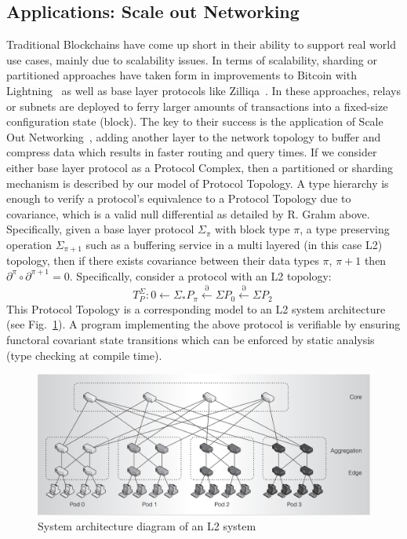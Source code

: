 \documentclass[runningheads]{llncs}
\begin{document}
\subsection{Applications: Scale out Networking}
Traditional Blockchains have come up short in their ability to support real world use cases, mainly due to scalability issues. In terms of scalability, sharding or partitioned approaches have taken form in improvements to Bitcoin with Lightning~\cite{ref_url4} as well as base layer protocols like Zilliqa~\cite{ref_url5}. In these approaches, relays or subnets are deployed to ferry larger amounts of transactions into a fixed-size configuration state (block). The key to their success is the application of Scale Out Networking~\cite{ref_article11}, adding another layer to the network topology to buffer and compress data which results in faster routing and query times. If we consider either base layer protocol as a Protocol Complex, then a partitioned or sharding mechanism is described by our model of Protocol Topology. A type hierarchy is enough to verify a protocol's equivalence to a Protocol Topology due to covariance, which is a valid null differential as detailed by R. Grahm above. Specifically, given a base layer protocol $\Sigma_\pi$ with block type $\pi$, a type preserving operation $\Sigma_{\pi+1}$ such as a buffering service in a multi layered (in this case L2) topology, then if there exists covariance between their data types $\pi$, $\pi+1$ then $\partial^\pi \circ \partial^{\pi+1} = 0$. Specifically, consider a protocol with an L2 topology:
\begin{equation}
T^{\Sigma}_P: 0 \leftarrow \Sigma_{*}P_\pi \xleftarrow{\partial} \Sigma P_{0} \xleftarrow{\partial} \Sigma P_2 \ 
\end{equation}
This Protocol Topology is a corresponding model to an L2 system architecture (see Fig.~\ref{fig1}). A program implementing the above protocol is verifiable by ensuring functoral covariant state transitions which can be enforced by static analysis~\cite{ref_article10} (type checking at compile time).
\begin{figure}
\centering
\includegraphics[width=0.6\columnwidth]{l2-system-architecture.png}
\caption{System architecture diagram of an L2 system ~\cite{ref_article11}} \label{fig1}
\end{figure}
\end{document}
